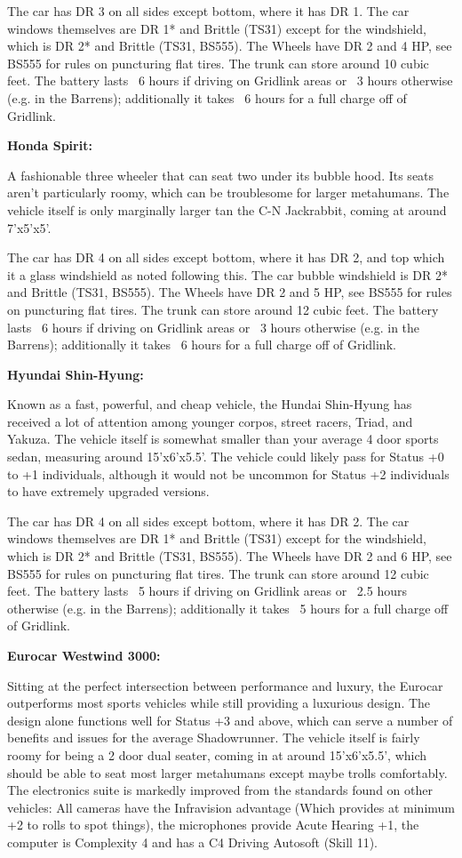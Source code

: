  The car has DR 3 on all sides except bottom, where it has DR 1. The car windows themselves are DR 1* and Brittle (TS31) except for the windshield, which is DR 2* and Brittle (TS31, BS555). The Wheels have DR 2 and 4 HP, see BS555 for rules on puncturing flat tires. The trunk can store around 10 cubic feet. The battery lasts ~6 hours if driving on Gridlink areas or ~3 hours otherwise (e.g. in the Barrens); additionally it takes ~6 hours for a full charge off of Gridlink.
 
 \textbf{Honda Spirit:}
 
 A fashionable three wheeler that can seat two under its bubble hood. Its seats aren't particularly roomy, which can be troublesome for larger metahumans. The vehicle itself is only marginally larger tan the C-N Jackrabbit, coming at around 7'x5'x5'.
 
 The car has DR 4 on all sides except bottom, where it has DR 2, and top which it a glass windshield as noted following this. The car bubble windshield is DR 2* and Brittle (TS31, BS555). The Wheels have DR 2 and 5 HP, see BS555 for rules on puncturing flat tires. The trunk can store around 12 cubic feet. The battery lasts ~6 hours if driving on Gridlink areas or ~3 hours otherwise (e.g. in the Barrens); additionally it takes ~6 hours for a full charge off of Gridlink.

\textbf{Hyundai Shin-Hyung:}

Known as a fast, powerful, and cheap vehicle, the Hundai Shin-Hyung has received a lot of attention among younger corpos, street racers, Triad, and Yakuza. The vehicle itself is somewhat smaller than your average 4 door sports sedan, measuring around 15'x6'x5.5'. The vehicle could likely pass for Status +0 to +1 individuals, although it would not be uncommon for Status +2 individuals to have extremely upgraded versions.

The car has DR 4 on all sides except bottom, where it has DR 2. The car windows themselves are DR 1* and Brittle (TS31) except for the windshield, which is DR 2* and Brittle (TS31, BS555). The Wheels have DR 2 and 6 HP, see BS555 for rules on puncturing flat tires. The trunk can store around 12 cubic feet. The battery lasts ~5 hours if driving on Gridlink areas or ~2.5 hours otherwise (e.g. in the Barrens); additionally it takes ~5 hours for a full charge off of Gridlink.

\textbf{Eurocar Westwind 3000:}

Sitting at the perfect intersection between performance and luxury, the Eurocar outperforms most sports vehicles while still providing a luxurious design. The design alone functions well for Status +3 and above, which can serve a number of benefits and issues for the average Shadowrunner. The vehicle itself is fairly roomy for being a 2 door dual seater, coming in at around 15'x6'x5.5', which should be able to seat most larger metahumans except maybe trolls comfortably. The electronics suite is markedly improved from the standards found on other vehicles: All cameras have the Infravision advantage (Which provides at minimum +2 to rolls to spot things), the microphones provide Acute Hearing +1, the computer is Complexity 4 and has a C4 Driving Autosoft (Skill 11).

